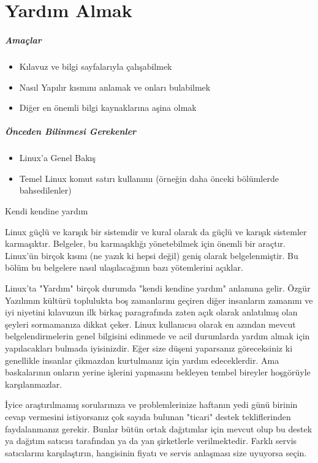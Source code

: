 \chapter{Yardım Almak}
\label{chap:bolum5}
\paragraph{Amaçlar}
\begin{itemize}
 \item Kılavuz ve bilgi sayfalarıyla çalışabilmek
 \item Nasıl Yapılır kısmını anlamak ve onları bulabilmek
 \item Diğer en önemli bilgi kaynaklarına aşina olmak
 \end{itemize}
\paragraph{Önceden Bilinmesi Gerekenler}
\begin{itemize}
 \item Linux'a Genel Bakış
 \item Temel Linux komut satırı kullanımı (örneğin daha önceki bölümlerde bahsedilenler)
\end{itemize}
\begin{section}{Kendi kendine yardım}

Linux güçlü ve karışık bir sistemdir ve kural olarak da güçlü ve karışık sistemler karmaşıktır. Belgeler, bu karmaşıklığı yönetebilmek için önemli bir araçtır. Linux'ün birçok kısmı (ne yazık ki hepsi değil) geniş olarak belgelenmiştir. Bu bölüm bu belgelere nasıl ulaşılacağının bazı yötemlerini açıklar.

Linux'ta "Yardım" birçok durumda "kendi kendine yardım" anlamına gelir. Özgür Yazılımın kültürü toplulukta boş zamanlarını geçiren diğer insanların zamanını ve iyi niyetini kılavuzun ilk birkaç paragrafında zaten açık olarak anlatılmış olan şeyleri sormamanıza dikkat çeker. Linux kullanıcısı olarak en azından mevcut belgelendirmelerin genel bilgisini edinmede ve acil durumlarda yardım almak için yapılacakları bulmada iyisinizdir. Eğer size düşeni yaparsanız göreceksiniz ki genellikle insanlar çikmazdan kurtulmanız için yardım edeceklerdir. Ama baskalarının onların yerine işlerini yapmasını bekleyen tembel bireyler hoşgörüyle karşılanmazlar.

İyice araştırılmamış sorularınıza ve problemlerinize haftanın yedi günü birinin cevap vermesini istiyorsanız çok sayıda bulunan "ticari" destek tekliflerinden faydalanmanız gerekir. Bunlar bütün ortak dağıtımlar için mevcut olup bu destek ya dağıtım satıcısı tarafından ya da yan şirketlerle verilmektedir. Farklı servis satıcılarını karşılaştırın, hangisinin fiyatı ve servis anlaşması size uyuyorsa seçin.
\end{section}
